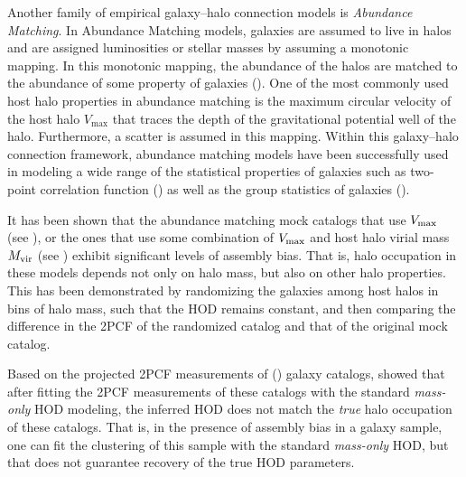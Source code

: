 \documentclass[twocolumn]{aastex61}
\begin{document}
Another family of empirical galaxy--halo connection models is \emph{Abundance} \emph{Matching}. In Abundance Matching models, galaxies are assumed to live in halos and are assigned luminosities or stellar masses by assuming a monotonic mapping. In this monotonic mapping, the abundance of the halos are matched to the abundance of some property of galaxies (\citealt{kravtsov2004,vale2004,tasitsiomi2004,conroy2009,guo2010,wetzel2010,Neisten2011,watson2012,rodriguez2012,kravstov2013,mao2015,chavez2016}). 
One of the most commonly used host halo properties in abundance matching is the maximum circular velocity of the host halo $V_\mathrm{max}$ that traces the depth of the gravitational potential well of the halo. Furthermore, a scatter is assumed in this mapping. Within this galaxy--halo connection framework, abundance matching models have been successfully used in modeling a wide range of the statistical properties of galaxies such as two-point correlation function (\citealt{reddick2013,lehman2015,hod_vs_sham}) as well as the group statistics of galaxies (\citealt{sham_gmf}). 

It has been shown that the abundance matching mock catalogs that use $V_{\rm max}$ (see \citealt{hw2013,arz2014}), or the ones that use some combination of $V_{\rm max}$ and host halo virial mass $M_{\rm vir}$ (see \citealt{lehman2015}) exhibit significant levels of assembly bias. 
That is, halo occupation in these models depends not only on halo mass, but also on other halo properties. This has been demonstrated by randomizing the galaxies among host halos in bins of halo mass, such that the HOD remains constant, and then comparing the difference in the 2PCF of the randomized catalog and that of the original mock catalog. 

Based on the projected 2PCF measurements of (\citealt{hw2013}) galaxy catalogs, \citet{arz2014} showed that after fitting the 2PCF measurements of these catalogs with the standard \emph{mass-only} HOD modeling, the inferred HOD does not match the \emph{true} halo occupation of these catalogs. That is, in the presence of assembly bias in a galaxy sample, one can fit the clustering of this sample with the standard \emph{mass-only} HOD, but that does not guarantee recovery of the true HOD parameters.
\end{document}
